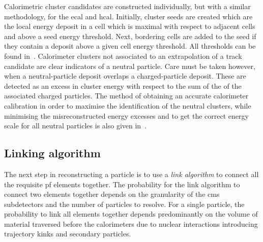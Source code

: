 Calorimetric cluster candidates are constructed individually, but with a similar methodology, for the \acrshort{ecal} and \acrshort{hcal}. 
Initially, cluster seeds are created which are the local energy deposit in a cell which is maximal with respect to adjacent cells and above a seed energy threshold.
Next, bordering cells are added to the seed if they contain a deposit above a given cell energy threshold.
All thresholds can be found in~\cite{Event:PFlow}.
Calorimeter clusters not associated to an extrapolation of a track candidate are clear indicators of a neutral particle.
Care must be taken however, when a neutral-particle deposit overlaps a charged-particle deposit.
These are detected as an excess in cluster energy with respect to the sum of the \pt{} of the associated charged particles.
The method of obtaining an accurate calorimeter calibration in order to maximise the identification of the neutral clusters, while minimising the misreconstructed energy excesses and to get the correct energy scale for all neutral particles is also given in~\cite{Event:PFlow}.


\subsection{Linking algorithm} %
\label{sub:linking_algorithm}

The next step in reconstructing a particle is to use a \textit{link algorithm} to connect all the requisite \acrshort{pf} elements together.
The probability for the link algorithm to connect two elements together depends on the granularity of the \acrshort{cms} subdetectors and the number of particles to resolve.
For a single particle, the probability to link all elements together depends predominantly on the volume of material traversed before the calorimeters due to nuclear interactions introducing trajectory kinks and secondary particles.


